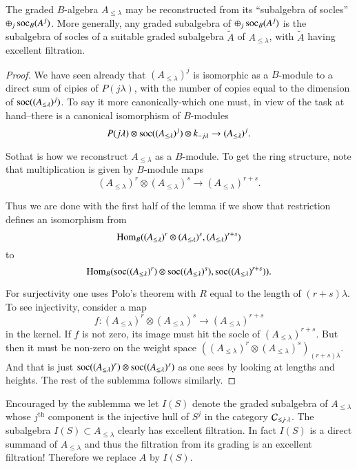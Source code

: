 \begin{sublemma}\label{chap4-sublem4.2.4}
The graded $B$-algebra $A_{\leq \lambda}$ may be reconstructed from
its ``subalgebra of socles'' 
$\oplus_{j}\operatorname{soc}_{B}(A^{j})$. More
generally, any graded subalgebra of $\oplus_{j}\operatorname{soc}_{B}(A^{j})$ is the
subalgebra of socles of a suitable graded subalgebra $\widetilde{A}$
of $A_{\leq\lambda}$, with $\widetilde{A}$ having excellent filtration.
\end{sublemma}

\begin{proof}
We have seen already that $(A_{\leq \lambda})^{j}$ is isomorphic as a
$B$-module to a direct sum of cipies of $P(j\lambda)$, with the number
of copies equal to the dimension of $\operatorname{soc}((A_{\leq\lambda})^{j})$. To
say it more canonically-which one must, in view of the task at
hand--there is a canonical isomorphism of $B$-modules
$$
P(j\lambda)\otimes \operatorname{soc} ((A_{\leq \lambda})^{j})\otimes
k_{-j\lambda}\to (A_{\leq \lambda})^{j}.
$$

So\pageoriginale that\label{page37} is how we reconstruct $A_{\leq \lambda}$ as a
$B$-module. To get the ring structure, note that multiplication is
given by $B$-module maps
$$
(A_{\leq \lambda})^{r}\otimes (A_{\leq \lambda})^{s}\to (A_{\leq
  \lambda})^{r+s}.
$$

Thus we are done with the first half of the lemma if we show that
restriction defines an isomorphism from
$$
\operatorname{Hom}_{B}((A_{\leq \lambda})^{r}\otimes (A_{\leq \lambda})^{s},(A_{\leq
  \lambda})^{r+s}) 
$$
to
$$
\operatorname{Hom}_{B}(\operatorname{soc}((A_{\leq \lambda})^{r})\otimes
\operatorname{soc}((A_{\leq\lambda})^{s}),\operatorname{soc}((A_{\leq \lambda})^{r+s})).
$$

For surjectivity one uses Polo's theorem with $R$ equal to the length
of $(r+s)\lambda$. To see injectivity, consider a map
$$
f:(A_{\leq \lambda})^{r}\otimes (A_{\leq \lambda})^{s}\to (A_{\leq
  \lambda})^{r+s} 
$$
in the kernel. If $f$ is not zero, its image must hit the socle of
$(A_{\leq \lambda})^{r+s}$. But then it must be non-zero on the weight
space $((A_{\leq \lambda})^{r}\otimes (A_{\leq
  \lambda})^{s})_{(r+s)\lambda}$. And that is just
$\operatorname{soc}((A_{\leq\lambda})^{r})\otimes \operatorname{soc}((A_{\leq \lambda})^{s})$ as
one sees by looking at lengths and heights. The rest of the sublemma
follows similarly.
\end{proof}

Encouraged by the sublemma we let $I(S)$ denote the graded subalgebra
of $A_{\leq \lambda}$ whose $j^{\text{th}}$ component is the injective
hull of $S^{j}$ in the category $\mathcal{C}_{\leq j\cdot\lambda}$. The
subalgebra $I(S)\subset A_{\leq \lambda}$ clearly has excellent
filtration. In fact $I(S)$ is a direct summand of $A_{\leq \lambda}$
and thus the filtration from its grading is an excellent filtration!
Therefore we replace $A$ by $I(S)$.

